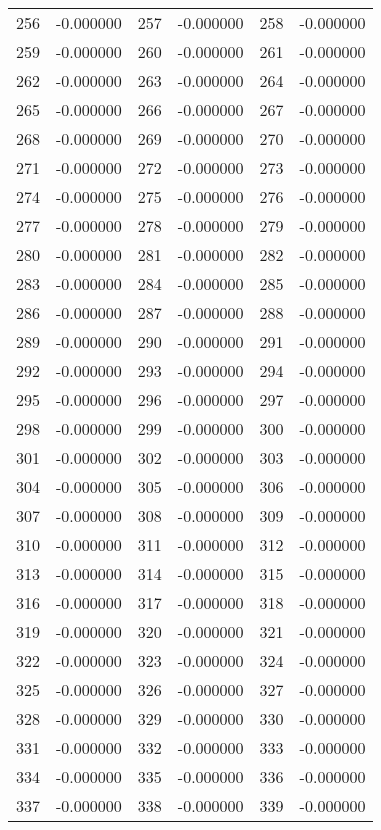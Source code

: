 \documentclass[12pt]{article}
\begin{document}
\begin{longtable}{@{}cc|cc|cc@{}}
256 & -0.000000 & 257 & -0.000000 & 258 & -0.000000 \\
259 & -0.000000 & 260 & -0.000000 & 261 & -0.000000 \\
262 & -0.000000 & 263 & -0.000000 & 264 & -0.000000 \\
265 & -0.000000 & 266 & -0.000000 & 267 & -0.000000 \\
268 & -0.000000 & 269 & -0.000000 & 270 & -0.000000 \\
271 & -0.000000 & 272 & -0.000000 & 273 & -0.000000 \\
274 & -0.000000 & 275 & -0.000000 & 276 & -0.000000 \\
277 & -0.000000 & 278 & -0.000000 & 279 & -0.000000 \\
280 & -0.000000 & 281 & -0.000000 & 282 & -0.000000 \\
283 & -0.000000 & 284 & -0.000000 & 285 & -0.000000 \\
286 & -0.000000 & 287 & -0.000000 & 288 & -0.000000 \\
289 & -0.000000 & 290 & -0.000000 & 291 & -0.000000 \\
292 & -0.000000 & 293 & -0.000000 & 294 & -0.000000 \\
295 & -0.000000 & 296 & -0.000000 & 297 & -0.000000 \\
298 & -0.000000 & 299 & -0.000000 & 300 & -0.000000 \\
301 & -0.000000 & 302 & -0.000000 & 303 & -0.000000 \\
304 & -0.000000 & 305 & -0.000000 & 306 & -0.000000 \\
307 & -0.000000 & 308 & -0.000000 & 309 & -0.000000 \\
310 & -0.000000 & 311 & -0.000000 & 312 & -0.000000 \\
313 & -0.000000 & 314 & -0.000000 & 315 & -0.000000 \\
316 & -0.000000 & 317 & -0.000000 & 318 & -0.000000 \\
319 & -0.000000 & 320 & -0.000000 & 321 & -0.000000 \\
322 & -0.000000 & 323 & -0.000000 & 324 & -0.000000 \\
325 & -0.000000 & 326 & -0.000000 & 327 & -0.000000 \\
328 & -0.000000 & 329 & -0.000000 & 330 & -0.000000 \\
331 & -0.000000 & 332 & -0.000000 & 333 & -0.000000 \\
334 & -0.000000 & 335 & -0.000000 & 336 & -0.000000 \\
337 & -0.000000 & 338 & -0.000000 & 339 & -0.000000 \\

\end{longtable}
\end{document}
